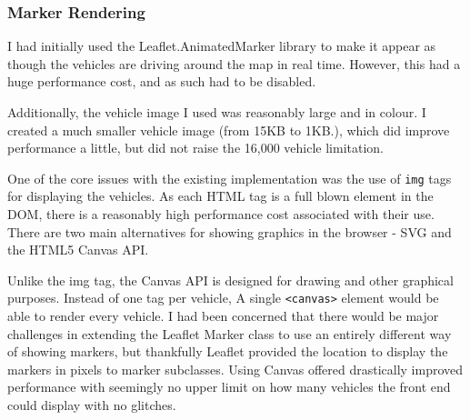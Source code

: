 \documentclass[ %
                    author={Alexander Hill},
                supervisor={Dr. Benjamin Sach},
                    degree={MEng},
                     title={MARMOSET},
                  subtitle={Multi-Agent Route Management using Online Simulation for Efficient Transportation},
                      type={research},
                      year={2016} ]{dissertation}
\begin{document}
\subsubsection{Marker Rendering}

I had initially used the Leaflet.AnimatedMarker library to make it appear as
though the vehicles are driving around the map in real time. However, this had a
huge performance cost, and as such had to be disabled.

Additionally, the vehicle image I used was reasonably large and in colour. I
created a much smaller vehicle image (from 15KB to 1KB.), which did improve
performance a little, but did not raise the 16,000 vehicle limitation.

One of the core issues with the existing implementation was the use of
\texttt{img} tags for displaying the vehicles. As each HTML tag is a full blown
element in the DOM, there is a reasonably high performance cost associated with
their use. There are two main alternatives for showing graphics in the browser -
SVG and the HTML5 Canvas API.

Unlike the img tag, the Canvas API is designed for drawing and other graphical
purposes. Instead of one tag per vehicle, A single \texttt{<canvas>} element
would be able to render every vehicle. I had been concerned that there would be
major challenges in extending the Leaflet Marker class to use an entirely
different way of showing markers, but thankfully Leaflet provided the location
to display the markers in pixels to marker subclasses. Using Canvas offered
drastically improved performance with seemingly no upper limit on how many
vehicles the front end could display with no glitches.
\end{document}
